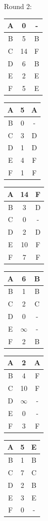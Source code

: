 \documentclass[10pt]{article}
\newenvironment{problem}[2][Problem]{\begin{trivlist}
\item[\hskip \labelsep {\bfseries #1}\hskip \labelsep {\bfseries #2.}]}{\end{trivlist}}
\begin{document}
\begin{problem}{3: Distance Vector Protocol}
\begin{enumerate}
Round 2:

\begin{tabular}{|c|c|c|}
\hline
A & 0 & - \\
\hline
B & 5 & B  \\
\hline
C & 14 & F  \\
\hline
D & 6 & B \\
\hline
E & 2 & E \\
\hline
F & 5 & E \\
\hline
\end{tabular}
\begin{tabular}{|c|c|c|}
\hline
A & 5 & A \\
\hline
B & 0 & -   \\
\hline
C & 3 & D \\
\hline
D & 1 & D \\
\hline
E & 4 & F \\
\hline
F & 1 & F \\
\hline
\end{tabular}
\begin{tabular}{|c|c|c|}
\hline
A & 14  & F \\
\hline
B & 3 & D \\
\hline
C & 0 & -  \\
\hline
D & 2 & D \\
\hline
E & 10 & F \\
\hline
F & 7 & F \\
\hline
\end{tabular}
\begin{tabular}{|c|c|c|}
\hline
A & 6 & B \\
\hline
B & 1 & B  \\
\hline
C & 2 & C \\
\hline
D & 0 & -  \\
\hline
E & $\infty$ & - \\
\hline
F & 2 & B \\
\hline
\end{tabular}
\begin{tabular}{|c|c|c|}
\hline
A & 2 & A \\
\hline
B & 4 & F  \\
\hline
C & 10 & F \\
\hline
D & $\infty$ & -  \\
\hline
E & 0 & - \\
\hline
F & 3 & F \\
\hline
\end{tabular}
\begin{tabular}{|c|c|c|}
\hline
A & 5 & E \\
\hline
B & 1 & B  \\
\hline
C & 7 & C  \\
\hline
D & 2 & B  \\
\hline
E & 3 &  E \\
\hline
F & 0 & - \\
\hline
\end{tabular}


\end{enumerate}
\end{problem}
\end{document}
